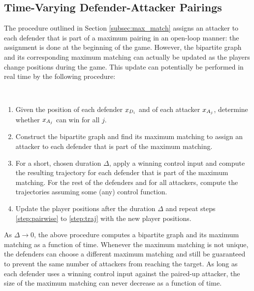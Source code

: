 \subsection{Time-Varying Defender-Attacker Pairings}
\label{subsec:tvarp}
The procedure outlined in Section \ref{subsec:max_match} assigns an attacker to each defender that is part of a maximum pairing in an open-loop manner: the assignment is done at the beginning of the game. However, the bipartite graph and its corresponding maximum matching can actually be updated as the players change positions during the game. This update can potentially be performed in real time by the following procedure:

\begin{alg}~
\begin{enumerate}
\item Given the position of each defender $x_{D_{i}}$ and of each attacker $x_{A_{j}}$, determine whether $x_{A_{j}}$ can win for all $j$. \label{step:pairwise}
\item Construct the bipartite graph and find its maximum matching to assign an attacker to each defender that is part of the maximum matching.
\item For a short, chosen duration $\Delta$, apply a winning control input and compute the resulting trajectory for each defender that is part of the maximum matching. For the rest of the defenders and for all attackers, compute the trajectories assuming some (any) control function. \label{step:traj}
\item Update the player positions after the duration $\Delta$ and repeat steps \ref{step:pairwise} to \ref{step:traj}  with the new player positions.
\end{enumerate}
\end{alg}

As $\Delta\rightarrow 0$, the above procedure computes a bipartite graph and its maximum matching as a function of time. Whenever the maximum matching is not unique, the defenders can choose a different maximum matching and still be guaranteed to prevent the same number of attackers from reaching the target. As long as each defender uses a winning control input against the paired-up attacker, the size of the maximum matching can never decrease as a function of time. 

